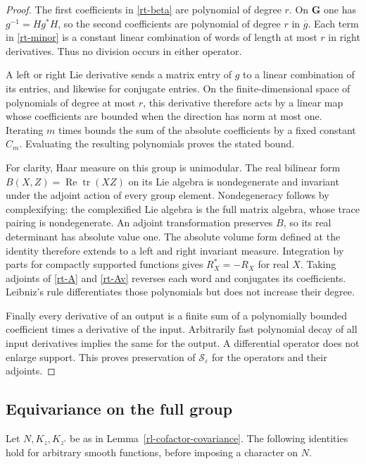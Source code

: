 \begin{proof}
The first coefficients in \eqref{rt-beta} are polynomial
of degree $r$.  On $\mathbf G$ one has $g^{-1}=Hg^*H$,
so the second coefficients are polynomial of degree $r$
in $\overline g$.  Each term in \eqref{rt-minor} is a
constant linear combination of words of length at most
$r$ in right derivatives.  Thus no division occurs in
either operator.

A left or right Lie derivative sends a matrix entry of
$g$ to a linear combination of its entries, and likewise
for conjugate entries.  On the finite-dimensional space
of polynomials of degree at most $r$, this derivative
therefore acts by a linear map whose coefficients are
bounded when the direction has norm at most one.
Iterating $m$ times bounds the sum of the absolute
coefficients by a fixed constant $C_m$.
Evaluating the resulting polynomials proves the
stated bound.

For clarity, Haar measure on this group is unimodular.
The real bilinear form
$B(X,Z)=\operatorname{Re}\operatorname{tr}(XZ)$ on its
Lie algebra is nondegenerate and invariant under the
adjoint action of every group element.  Nondegeneracy
follows by complexifying: the complexified Lie algebra
is the full matrix algebra, whose trace pairing is
nondegenerate.  An adjoint transformation preserves
$B$, so its real determinant has absolute value one.
The absolute volume form defined at the identity
therefore extends to a left and right invariant
measure.  Integration by parts for compactly supported
functions gives $R_X^*=-R_X$ for real $X$.
Taking adjoints of \eqref{rt-A} and \eqref{rt-Av}
reverses each word and conjugates its coefficients.
Leibniz's rule differentiates those polynomials but
does not increase their degree.

Finally every derivative of an output is a finite sum
of a polynomially bounded coefficient times a derivative
of the input.  Arbitrarily fast polynomial decay of
all input derivatives implies the same for the output.
A differential operator does not enlarge support.
This proves preservation of $\mathscr S_\varepsilon$
for the operators and their adjoints.
\end{proof}

\subsection{Equivariance on the full group}

Let $N,K_z,K_{z'}$ be as in
Lemma~\ref{rl-cofactor-covariance}.
The following identities hold for arbitrary smooth
functions, before imposing a character on $N$.

